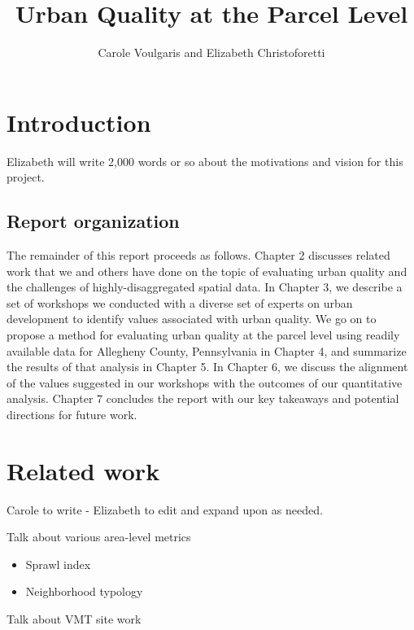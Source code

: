 \documentclass[
]{book}
\title{Urban Quality at the Parcel Level}
\author{Carole Voulgaris and Elizabeth Christoforetti}
\date{}
\providecommand{\tightlist}{%
  \setlength{\itemsep}{0pt}\setlength{\parskip}{0pt}}
\begin{document}
\maketitle

{
\setcounter{tocdepth}{1}
\tableofcontents
}
\hypertarget{introduction}{%
\chapter{Introduction}\label{introduction}}

Elizabeth will write 2,000 words or so about the motivations and vision for
this project.

\hypertarget{report-organization}{%
\section{Report organization}\label{report-organization}}

The remainder of this report proceeds as follows. Chapter 2 discusses related
work that we and others have done on the topic of evaluating urban quality
and the challenges of highly-disaggregated spatial data. In Chapter 3, we
describe a set of workshops we conducted with a diverse set of experts on
urban development to identify values associated with urban quality. We go on
to propose a method for evaluating urban quality at the parcel level using
readily available data for Allegheny County, Pennsylvania in Chapter 4, and
summarize the results of that analysis in Chapter 5. In Chapter 6, we discuss
the alignment of the values suggested in our workshops with the outcomes
of our quantitative analysis. Chapter 7 concludes the report with our key
takeaways and potential directions for future work.

\hypertarget{related-work}{%
\chapter{Related work}\label{related-work}}

Carole to write - Elizabeth to edit and expand upon as needed.

Talk about various area-level metrics

\begin{itemize}
\tightlist
\item
  Sprawl index
\item
  Neighborhood typology
\end{itemize}

Talk about VMT site work
\end{document}
